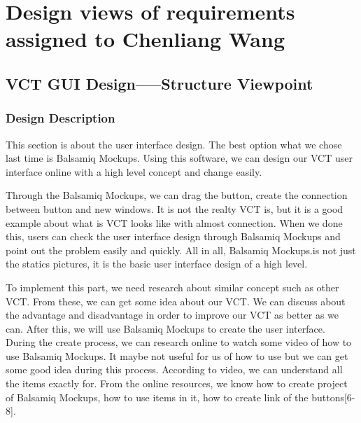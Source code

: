 \documentclass [10pt]{article}
\begin{document}
\clearpage
\section{Design views of requirements assigned to Chenliang Wang}
\subsection{VCT GUI Design-----Structure Viewpoint}
\subsubsection{Design Description}
This section is about the user interface design. The best option what we chose last time is Balsamiq Mockups. Using this software, we can design our VCT user interface online with a high level concept and change easily. \par
Through the Balsamiq Mockups, we can drag the button, create the connection between button and new windows. It is not the realty VCT is, but it is a good example about what is VCT looks like with almost connection. When we done this, users can check the user interface design through Balsamiq Mockups and point out the problem easily and quickly. All in all, Balsamiq Mockups.is not just the statics pictures, it is the basic user interface design of a high level. \par
To implement this part, we need research about similar concept such as other VCT. From these, we can get some idea about our VCT. We can discuss about the advantage and disadvantage in order to improve our VCT as better as we can. After this, we will use Balsamiq Mockups to create the user interface. During the create process, we can research online to watch some video of how to use Balsamiq Mockups. It maybe not useful for us of how to use but we can get some good idea during this process. According to video, we can understand all the items exactly for. From the online resources, we know how to create project of Balsamiq Mockups, how to use items in it, how to create link of the buttons[6-8]. \par
\end{document}
